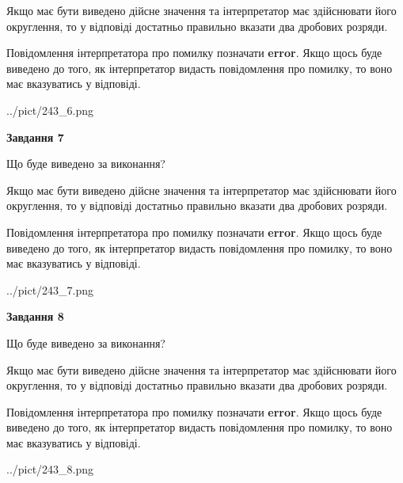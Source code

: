 \documentclass[12pt, ukrainian]{article}
\begin{document}
{\begin {Large}
Якщо має бути виведено дійсне значення та інтерпретатор має здійснювати його округлення, 
то у відповіді достатньо правильно вказати два дробових розряди.

Повідомлення інтерпретатора про помилку позначати \textbf{error}.
Якщо щось буде виведено до того, як інтерпретатор видасть повідомлення про помилку, 
то воно має вказуватись у відповіді. \par

\begin{center}
	{../pict/243_6.png}
\end{center}
\newpage

{\begin {center}\textbf{Завдання 7}\end {center}}\par
Що буде виведено за виконання? \par

Якщо має бути виведено дійсне значення та інтерпретатор має здійснювати його округлення, 
то у відповіді достатньо правильно вказати два дробових розряди.

Повідомлення інтерпретатора про помилку позначати \textbf{error}.
Якщо щось буде виведено до того, як інтерпретатор видасть повідомлення про помилку, 
то воно має вказуватись у відповіді. \par

\begin{center}
	{../pict/243_7.png}
\end{center}
\newpage

{\begin {center}\textbf{Завдання 8}\end {center}}\par
Що буде виведено за виконання? \par

Якщо має бути виведено дійсне значення та інтерпретатор має здійснювати його округлення, 
то у відповіді достатньо правильно вказати два дробових розряди.

Повідомлення інтерпретатора про помилку позначати \textbf{error}.
Якщо щось буде виведено до того, як інтерпретатор видасть повідомлення про помилку, 
то воно має вказуватись у відповіді. \par

\begin{center}
	{../pict/243_8.png}
\end{center}
\newpage


\end{Large}}
\end{document}
